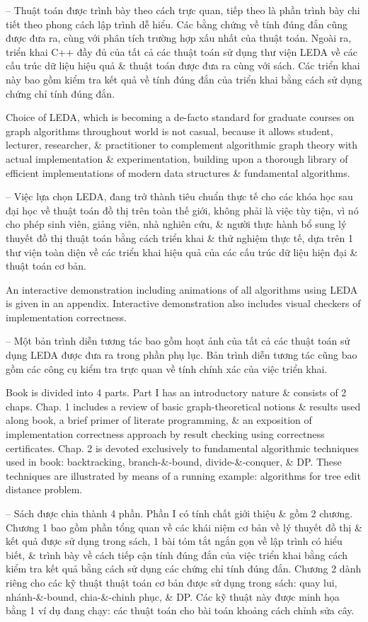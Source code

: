 \documentclass{article}
\begin{document}
\begin{itemize}
	-- Thuật toán được trình bày theo cách trực quan, tiếp theo là phần trình bày chi tiết theo phong cách lập trình dễ hiểu. Các bằng chứng về tính đúng đắn cũng được đưa ra, cùng với phân tích trường hợp xấu nhất của thuật toán. Ngoài ra, triển khai C++ đầy đủ của tất cả các thuật toán sử dụng thư viện LEDA về các cấu trúc dữ liệu hiệu quả \& thuật toán được đưa ra cùng với sách. Các triển khai này bao gồm kiểm tra kết quả về tính đúng đắn của triển khai bằng cách sử dụng chứng chỉ tính đúng đắn.
	
	Choice of LEDA, which is becoming a de-facto standard for graduate courses on graph algorithms throughout world is not casual, because it allows student, lecturer, researcher, \& practitioner to complement algorithmic graph theory with actual implementation \& experimentation, building upon a thorough library of efficient implementations of modern data structures \& fundamental algorithms.
	
	-- Việc lựa chọn LEDA, đang trở thành tiêu chuẩn thực tế cho các khóa học sau đại học về thuật toán đồ thị trên toàn thế giới, không phải là việc tùy tiện, vì nó cho phép sinh viên, giảng viên, nhà nghiên cứu, \& người thực hành bổ sung lý thuyết đồ thị thuật toán bằng cách triển khai \& thử nghiệm thực tế, dựa trên 1 thư viện toàn diện về các triển khai hiệu quả của các cấu trúc dữ liệu hiện đại \& thuật toán cơ bản.
	
	An interactive demonstration including animations of all algorithms using LEDA is given in an appendix. Interactive demonstration also includes visual checkers of implementation correctness.
	
	-- Một bản trình diễn tương tác bao gồm hoạt ảnh của tất cả các thuật toán sử dụng LEDA được đưa ra trong phần phụ lục. Bản trình diễn tương tác cũng bao gồm các công cụ kiểm tra trực quan về tính chính xác của việc triển khai.
	
	Book is divided into 4 parts. Part I has an introductory nature \& consists of 2 chaps. Chap. 1 includes a review of basic graph-theoretical notions \& results used along book, a brief primer of literate programming, \& an exposition of implementation correctness approach by result checking using correctness certificates. Chap. 2 is devoted exclusively to fundamental algorithmic techniques used in book: backtracking, branch-\&-bound, divide-\&-conquer, \& DP. These techniques are illustrated by means of a running example: algorithms for tree edit distance problem.
	
	-- Sách được chia thành 4 phần. Phần I có tính chất giới thiệu \& gồm 2 chương. Chương 1 bao gồm phần tổng quan về các khái niệm cơ bản về lý thuyết đồ thị \& kết quả được sử dụng trong sách, 1 bài tóm tắt ngắn gọn về lập trình có hiểu biết, \& trình bày về cách tiếp cận tính đúng đắn của việc triển khai bằng cách kiểm tra kết quả bằng cách sử dụng các chứng chỉ tính đúng đắn. Chương 2 dành riêng cho các kỹ thuật thuật toán cơ bản được sử dụng trong sách: quay lui, nhánh-\&-bound, chia-\&-chinh phục, \& DP. Các kỹ thuật này được minh họa bằng 1 ví dụ đang chạy: các thuật toán cho bài toán khoảng cách chỉnh sửa cây.
	

\end{itemize}
\end{document}
